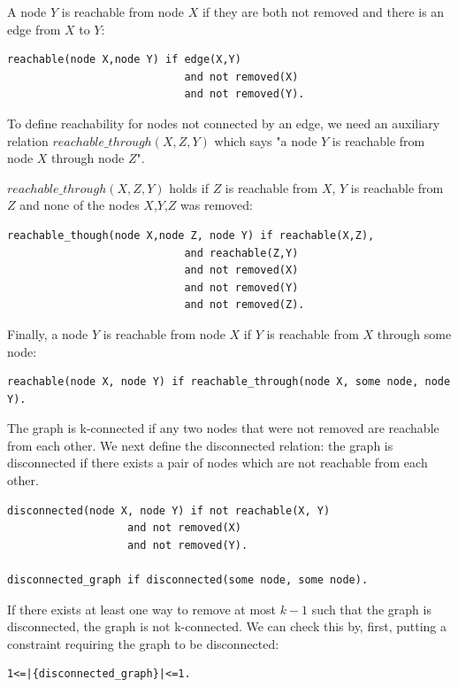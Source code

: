 \documentclass[a4paper,10pt]{article}
\begin{document}
\medskip\noindent
A node $Y$ is reachable from node $X$ if they are both not removed and there is an edge from $X$ to $Y$:
\begin{verbatim}
reachable(node X,node Y) if edge(X,Y) 
                            and not removed(X) 
                            and not removed(Y). 
\end{verbatim}

\medskip\noindent

To define reachability for nodes not connected by an edge, we need an auxiliary relation $reachable\_through(X,Z,Y)$ which says
"a node $Y$ is reachable from node $X$ through node $Z$".

$reachable\_through(X,Z,Y)$ holds if $Z$ is reachable from $X$, $Y$ is reachable from $Z$ and none of the nodes $X$,$Y$,$Z$ was removed:

\begin{verbatim}
reachable_though(node X,node Z, node Y) if reachable(X,Z),              
                            and reachable(Z,Y) 
                            and not removed(X) 
                            and not removed(Y) 
                            and not removed(Z).
\end{verbatim}

Finally, a node $Y$ is reachable from node $X$ if $Y$ is reachable from $X$ through some node:

\begin{verbatim}
reachable(node X, node Y) if reachable_through(node X, some node, node Y).
\end{verbatim} 


\medskip\noindent
The graph is k-connected if any two nodes  that were not removed are reachable from each other.
We next define the disconnected relation: the graph is disconnected if there exists a pair of nodes which are not reachable from
each other.

\begin{verbatim}
disconnected(node X, node Y) if not reachable(X, Y) 
                   and not removed(X)
                   and not removed(Y).                

disconnected_graph if disconnected(some node, some node).   
\end{verbatim}
If there exists at least one way to remove at most $k-1$ such that the graph is disconnected, the graph is not k-connected.
We can check this by, first, putting a constraint requiring the graph to be disconnected:

\begin{verbatim}
1<=|{disconnected_graph}|<=1.
\end{verbatim}
\end{document}
